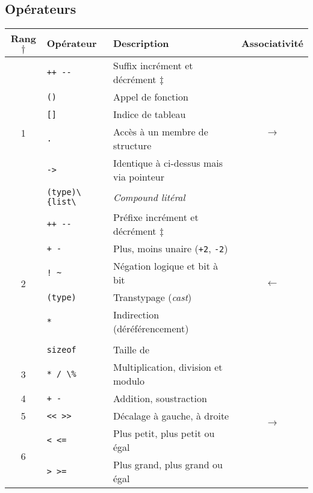 \documentclass{article}
\newcommand{\cd}{\lstinline}
\begin{document}
\begin{multicols*}{3}
\section*{Opérateurs}

\begin{tabularx}{\linewidth}{c|l|X|c}
  \bf Rang$\dagger$ & \bf Opérateur & \bf Description & \bf Associativité \\
  \hline
  \multirow{6}{*}{1} & \cd{++ --}  & Suffix incrément et décrément $\ddagger$ & \multirow{6}{*}{$\rightarrow$} \\
                     & \cd{()}     & Appel de fonction                     & \\
                     & \cd{[]}     & Indice de tableau                     & \\
                     & \cd{.}      & Accès à un membre de structure        & \\
                     & \cd{->}     & Identique à ci-dessus mais via pointeur & \\
                     & \cd{(type)\{list\}} & \emph{Compound litéral} & \\
  \hline
  \multirow{7}{*}{2} & \cd{++ --}  & Préfixe incrément et décrément $\ddagger$ & \multirow{7}{*}{$\leftarrow$} \\
                     & \cd{+ -}    & Plus, moins unaire (\cd{+2}, \cd{-2}) & \\
                     & \cd{! ~}    & Négation logique et bit à bit & \\
                     & \cd{(type)} & Transtypage (\emph{cast}) & \\
                     & \cd{*}      & Indirection (déréférencement) & \\
                     & \cd{&}      & Adresse de & \\
                     & \cd{sizeof} & Taille de & \\
  \hline
  3                  & \cd{* / \%}  & Multiplication, division et modulo & \multirow{11}{*}{$\rightarrow$} \\
  \cline{1-3}
  4                  & \cd{+ -}    & Addition, soustraction & \\
  \cline{1-3}
  5                  & \cd{<< >>}  & Décalage à gauche, à droite & \\
  \cline{1-3}
  \multirow{2}{*}{6}  & \cd{< <=}   & Plus petit, plus petit ou égal & \\
                     & \cd{> >=}   & Plus grand, plus grand ou égal & \\

\end{tabularx}
\end{multicols*}
\end{document}
